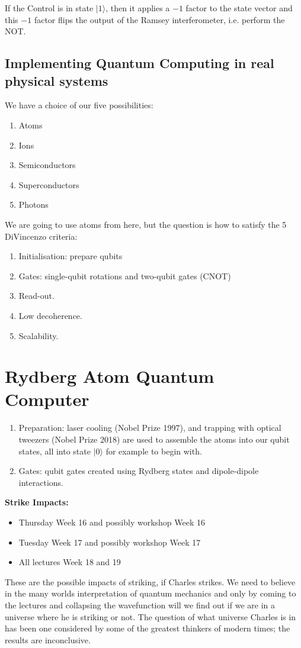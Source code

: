 \documentclass[a4paper, 11pt, normalem]{report}
\begin{document}
If the Control is in state $|1\rangle$, then it applies a $-1$ factor to the state vector and this $-1$ factor flips the output of the Ramsey interferometer, i.e. perform the NOT.

\section{Implementing Quantum Computing in real physical systems}
We have a choice of our five possibilities:
\begin{enumerate}
    \item Atoms
    \item Ions
    \item Semiconductors
    \item Superconductors
    \item Photons
\end{enumerate}
We are going to use atoms from here, but the question is how to satisfy the 5 DiVincenzo criteria:
\begin{enumerate}
    \item Initialisation: prepare qubits
    \item Gates: single-qubit rotations and two-qubit gates (CNOT)
    \item Read-out.
    \item Low decoherence.
    \item Scalability.
\end{enumerate}

\chapter{Rydberg Atom Quantum Computer}
\begin{enumerate}
    \item Preparation: laser cooling (Nobel Prize 1997), and trapping with optical tweezers (Nobel Prize 2018) are used to assemble the atoms into our qubit states, all into state $|0\rangle$ for example to begin with.
    \item Gates: qubit gates created using Rydberg states and dipole-dipole interactions.
\end{enumerate}

\textbf{Strike Impacts:}
\begin{itemize}
    \item Thursday Week 16 and possibly workshop Week 16
    \item Tuesday Week 17 and possibly workshop Week 17
    \item All lectures Week 18 and 19
\end{itemize}
These are the possible impacts of striking, if Charles strikes.
We need to believe in the many worlds interpretation of quantum mechanics and only by coming to the lectures and collapsing the wavefunction will we find out if we are in a universe where he is striking or not.
The question of what universe Charles is in has been one considered by some of the greatest thinkers of modern times; the results are inconclusive.
\end{document}
